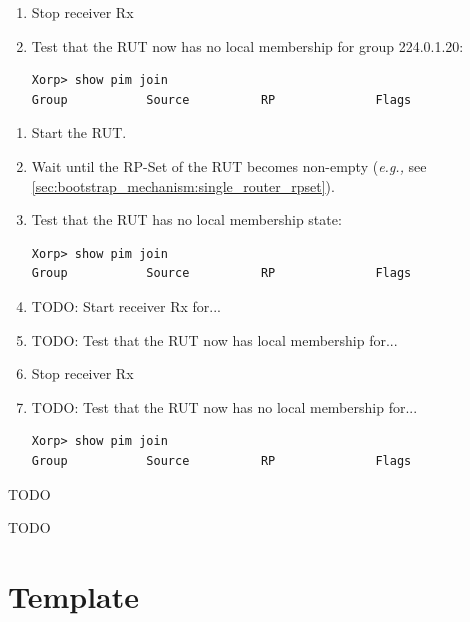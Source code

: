 \documentclass[11pt]{report}
\newcommand{\eg}{\emph{e.g.,}\xspace}
\begin{document}
\begin{enumerate}
  \item Stop receiver Rx

  \item Test that the RUT now has no local membership for group 224.0.1.20:

\begin{verbatim}
Xorp> show pim join
Group           Source          RP              Flags
\end{verbatim}

\end{enumerate}


\begin{enumerate}

  \item Start the RUT.

  \item Wait until the RP-Set of the RUT becomes non-empty (\eg see
        \ref{sec:bootstrap_mechanism:single_router_rpset}).

  \item Test that the RUT has no local membership state:

\begin{verbatim}
Xorp> show pim join
Group           Source          RP              Flags
\end{verbatim}

  \item TODO: Start receiver Rx for...

  \item TODO: Test that the RUT now has local membership for...

  \item Stop receiver Rx

  \item TODO: Test that the RUT now has no local membership for...

\begin{verbatim}
Xorp> show pim join
Group           Source          RP              Flags
\end{verbatim}

\end{enumerate}

TODO

TODO

\newpage
\section{Template}
\end{document}
